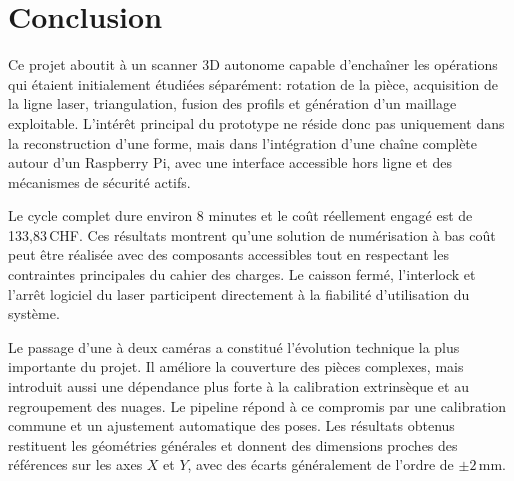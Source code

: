 \section{Conclusion}

Ce projet aboutit à un scanner 3D autonome capable d'enchaîner les opérations
qui étaient initialement étudiées séparément: rotation de la pièce, acquisition
de la ligne laser, triangulation, fusion des profils et génération d'un
maillage exploitable. L'intérêt principal du prototype ne réside donc pas
uniquement dans la reconstruction d'une forme, mais dans l'intégration d'une
chaîne complète autour d'un Raspberry Pi, avec une interface accessible hors
ligne et des mécanismes de sécurité actifs.

Le cycle complet dure environ 8 minutes et le coût réellement engagé est de
133,83\,CHF. Ces résultats montrent qu'une solution de numérisation à bas coût
peut être réalisée avec des composants accessibles tout en respectant les
contraintes principales du cahier des charges. Le caisson fermé, l'interlock et
l'arrêt logiciel du laser participent directement à la fiabilité d'utilisation
du système.

Le passage d'une à deux caméras a constitué l'évolution technique la plus
importante du projet. Il améliore la couverture des pièces complexes, mais
introduit aussi une dépendance plus forte à la calibration extrinsèque et au
regroupement des nuages. Le pipeline répond à ce compromis par une calibration
commune et un ajustement automatique des poses. Les résultats obtenus
restituent les géométries générales et donnent des dimensions proches des
références sur les axes $X$ et $Y$, avec des écarts généralement de l'ordre de
$\pm 2$\,mm.

